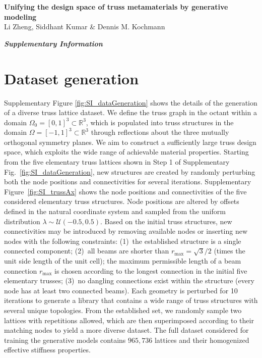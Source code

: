 \documentclass[fleqn,10pt]{wlscirep}
\begin{document}
{\sffamily\Large \textbf{Unifying the design space of truss metamaterials by generative modeling}}\\[0.2cm]
Li Zheng, Siddhant Kumar \& Dennis M. Kochmann

\vskip 0.5cm
{\sffamily\Large \textbf{\textit{Supplementary Information}}}
\flushbottom
\section{Dataset generation}
\label{sec:SI-dataGeneration}
Supplementary Figure \ref{fig:SI_dataGeneration} shows the details of the generation of a diverse truss lattice dataset. We define the truss graph in the octant within a domain $\Omega_0 = [0,1]^3 \subset \mathbb{R}^3$, which is populated into truss structures in the domain $\Omega = [-1,1]^3 \subset \mathbb{R}^3$ through reflections about the three mutually orthogonal symmetry planes. We aim to construct a sufficiently large truss design space, which exploits the wide range of achievable material properties. Starting from the five elementary truss lattices shown in Step 1 of Supplementary Fig.~\ref{fig:SI_dataGeneration}, new structures are created by randomly perturbing both the node positions and connectivities for several iterations. Supplementary Figure~\ref{fig:SI_trussAx} shows the node positions and connectivities of the five considered elementary truss structures. Node positions are altered by offsets defined in the natural coordinate system \cite{panetta2015elastic} and sampled from the uniform distribution $\lambda \sim \mathcal{U}(-0.5,0.5)$. Based on the initial truss structures, new connectivities may be introduced by removing available nodes or inserting new nodes with the following constraints: (1)~the established structure is a single connected component; (2)~all beams are shorter than $r_{\text{max}} = \sqrt{3}/2$ (times the unit side length of the unit cell); the maximum permissible length of a beam connection $r_{\text{max}}$ is chosen according to the longest connection in the initial five elementary trusses; (3)~no dangling connections exist within the structure (every node has at least two connected beams). Each geometry is perturbed for 10 iterations to generate a library that contains a wide range of truss structures with several unique topologies. From the established set, we randomly sample two lattices with repetitions allowed, which are then superimposed according to their matching nodes to yield a more diverse dataset. The full dataset considered for training the generative models contains $965{,}736$ lattices and their homogenized effective stiffness properties. 
\end{document}
